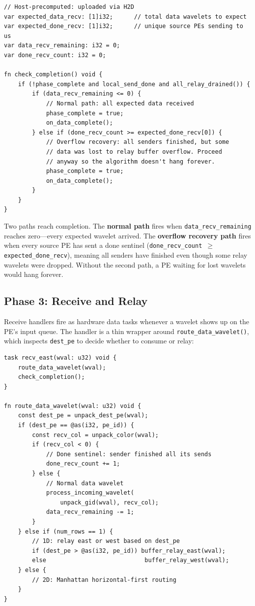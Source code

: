 \documentclass[11pt,letterpaper]{article}
\begin{document}
\begin{lstlisting}[language=CSL, numbers=none, caption={Dual-path completion (from \texttt{pe\_program.csl})}]
// Host-precomputed: uploaded via H2D
var expected_data_recv: [1]i32;      // total data wavelets to expect
var expected_done_recv: [1]i32;      // unique source PEs sending to us
var data_recv_remaining: i32 = 0;
var done_recv_count: i32 = 0;

fn check_completion() void {
    if (!phase_complete and local_send_done and all_relay_drained()) {
        if (data_recv_remaining <= 0) {
            // Normal path: all expected data received
            phase_complete = true;
            on_data_complete();
        } else if (done_recv_count >= expected_done_recv[0]) {
            // Overflow recovery: all senders finished, but some
            // data was lost to relay buffer overflow. Proceed
            // anyway so the algorithm doesn't hang forever.
            phase_complete = true;
            on_data_complete();
        }
    }
}
\end{lstlisting}

Two paths reach completion. The \textbf{normal path} fires when \texttt{data\_recv\_remaining} reaches zero---every expected wavelet arrived. The \textbf{overflow recovery path} fires when every source PE has sent a done sentinel (\texttt{done\_recv\_count $\geq$ expected\_done\_recv}), meaning all senders have finished even though some relay wavelets were dropped. Without the second path, a PE waiting for lost wavelets would hang forever.

\subsection{Phase 3: Receive and Relay}

Receive handlers fire as hardware data tasks whenever a wavelet shows up on the PE's input queue. The handler is a thin wrapper around \texttt{route\_data\_wavelet()}, which inspects \texttt{dest\_pe} to decide whether to consume or relay:

\begin{lstlisting}[language=CSL, caption={East receive handler (from \texttt{pe\_program.csl})}, label=lst:recv]
task recv_east(wval: u32) void {
    route_data_wavelet(wval);
    check_completion();
}

fn route_data_wavelet(wval: u32) void {
    const dest_pe = unpack_dest_pe(wval);
    if (dest_pe == @as(i32, pe_id)) {
        const recv_col = unpack_color(wval);
        if (recv_col < 0) {
            // Done sentinel: sender finished all its sends
            done_recv_count += 1;
        } else {
            // Normal data wavelet
            process_incoming_wavelet(
                unpack_gid(wval), recv_col);
            data_recv_remaining -= 1;
        }
    } else if (num_rows == 1) {
        // 1D: relay east or west based on dest_pe
        if (dest_pe > @as(i32, pe_id)) buffer_relay_east(wval);
        else                            buffer_relay_west(wval);
    } else {
        // 2D: Manhattan horizontal-first routing
    }
}
\end{lstlisting}
\end{document}
